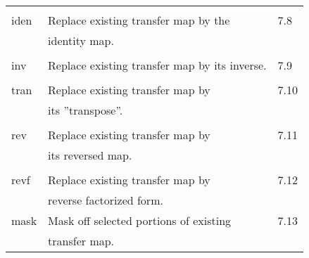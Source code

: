 \begin{center}
\begin{tabular}{lll}
\vspace{-3mm}& &\\
\hspace{1.5em}iden  &         Replace existing transfer map by the & \hspace{2em}7.8\\
                    & identity map.                                &\\
\vspace{-3mm}& &\\
\hspace{1.5em}inv   & Replace existing transfer map by its inverse. & \hspace{2em}7.9\\
\vspace{-3mm}& &\\
\hspace{1.5em}tran  &Replace existing transfer map by         &\hspace{2em}7.10\\
                    & its ''transpose''.                            &\\
\vspace{-3mm}& &\\
\hspace{1.5em}rev   &        Replace existing transfer map by      & \hspace{2em}7.11\\
                    & its reversed map.                            &\\
\vspace{-3mm}& &\\
\hspace{1.5em}revf  &         Replace existing transfer map by     & \hspace{2em}7.12\\
                    & reverse factorized form.                     &\\
\hspace{1.5em}mask  &      Mask off selected portions of existing & \hspace{2em}7.13\\
                    & transfer map.                                &\\
\end{tabular}


\end{center}

